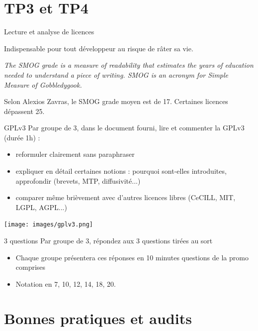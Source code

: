 \documentclass{beamer}
\begin{document}
\section{TP3 et TP4}


\begin{frame}{Lecture et analyse de licences}

Indispensable pour tout développeur au risque de râter sa vie.

\textit{The SMOG grade is a measure of readability that estimates the years of education needed to understand a piece of writing. SMOG is an acronym for Simple Measure of Gobbledygook.}

Selon Alexios Zavras, le SMOG grade moyen est de 17. Certaines licences dépassent 25.

\end{frame}


\begin{frame}{GPLv3}
  Par groupe de 3, dans le document fourni, lire et commenter la GPLv3 (durée 1h) :
  \begin{itemize}
    \item reformuler clairement sans paraphraser
    \item expliquer en détail certaines notions : pourquoi sont-elles introduites, approfondir (brevets, MTP, diffusivité...)
    \item comparer même brièvement avec d'autres licences libres (CeCILL, MIT, LGPL, AGPL...)
   \end{itemize}

  \begin{center}
    \texttt{[image: images/gplv3.png]}
\end{center}
\end{frame}


\begin{frame}{3 questions}
 Par groupe de 3, répondez aux 3 questions tirées au sort
 \begin{itemize}
 \item Chaque groupe présentera ces réponses en 10 minutes
   questions de la promo comprises
 \item Notation en 7, 10, 12, 14, 18, 20.
 \end{itemize}
\end{frame}



\section{Bonnes pratiques et audits}
\end{document}
